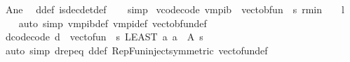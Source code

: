 \begin{isabellebody}
\ A{\isacharunderscore}{\kern0pt}ne\ \isamarkupfalse%
\ d{}{\isacharunderscore}{\kern0pt}def\ is{\isacharunderscore}{\kern0pt}dec{\isacharunderscore}{\kern0pt}det{\isacharunderscore}{\kern0pt}def\isanewline
\ \ \isamarkupfalse%
\ simp%
\endisatagproof
{\isafoldproof}%
%
\isadelimproof
\isanewline
%
\endisadelimproof
\isanewline
{}\isamarkupfalse%
\ v{}{\isacharunderscore}{\kern0pt}code{\isacharbrackleft}{\kern0pt}code{\isacharbrackright}{\kern0pt}{\isacharcolon}{\kern0pt}\ {\isachardoublequoteopen}v{}{\isacharunderscore}{\kern0pt}mpi\isactrlsub b\ {\isacharequal}{\kern0pt}\ vec{\isacharunderscore}{\kern0pt}to{\isacharunderscore}{\kern0pt}bfun\ {\isacharparenleft}{\kern0pt}{\isasymchi}\ s{\isachardot}{\kern0pt}\ r{\isacharunderscore}{\kern0pt}min\ {\isacharslash}{\kern0pt}\ {\isacharparenleft}{\kern0pt}{}\ {\isacharminus}{\kern0pt}\ l{\isacharparenright}{\kern0pt}{\isacharparenright}{\kern0pt}{\isachardoublequoteclose}\isanewline
%
\isadelimproof
\ \ %
\endisadelimproof
%
\isatagproof
{}\isamarkupfalse%
\ {\isacharparenleft}{\kern0pt}auto\ simp{\isacharcolon}{\kern0pt}\ v{}{\isacharunderscore}{\kern0pt}mpi\isactrlsub b{\isacharunderscore}{\kern0pt}def\ v{}{\isacharunderscore}{\kern0pt}mpi{\isacharunderscore}{\kern0pt}def\ vec{\isacharunderscore}{\kern0pt}to{\isacharunderscore}{\kern0pt}bfun{\isacharunderscore}{\kern0pt}def\ {\isacharparenright}{\kern0pt}%
\endisatagproof
{\isafoldproof}%
%
\isadelimproof
\isanewline
%
\endisadelimproof
\isanewline
{}\isamarkupfalse%
\ d{}{\isacharprime}{\kern0pt}{\isacharunderscore}{\kern0pt}code{\isacharbrackleft}{\kern0pt}code{\isacharbrackright}{\kern0pt}{\isacharcolon}{\kern0pt}\ {\isachardoublequoteopen}d{}{\isacharprime}{\kern0pt}\ {\isacharequal}{\kern0pt}\ vec{\isacharunderscore}{\kern0pt}to{\isacharunderscore}{\kern0pt}fun\ {\isacharparenleft}{\kern0pt}{\isasymchi}\ s{\isachardot}{\kern0pt}\ {\isacharparenleft}{\kern0pt}LEAST\ a{\isachardot}{\kern0pt}\ a\ {\isasymin}\ A\ s{\isacharparenright}{\kern0pt}{\isacharparenright}{\kern0pt}{\isachardoublequoteclose}\isanewline
%
\isadelimproof
\ \ %
\endisadelimproof
%
\isatagproof
{}\isamarkupfalse%
\ {\isacharparenleft}{\kern0pt}auto\ simp{\isacharcolon}{\kern0pt}\ d{}{\isacharprime}{\kern0pt}{\isachardot}{\kern0pt}rep{\isacharunderscore}{\kern0pt}eq\ d{}{\isacharunderscore}{\kern0pt}def\ Rep{\isacharunderscore}{\kern0pt}Fun{\isacharunderscore}{\kern0pt}inject{\isacharbrackleft}{\kern0pt}symmetric{\isacharbrackright}{\kern0pt}\ vec{\isacharunderscore}{\kern0pt}to{\isacharunderscore}{\kern0pt}fun{\isacharunderscore}{\kern0pt}def{\isacharparenright}{\kern0pt}%

\end{isabellebody}
